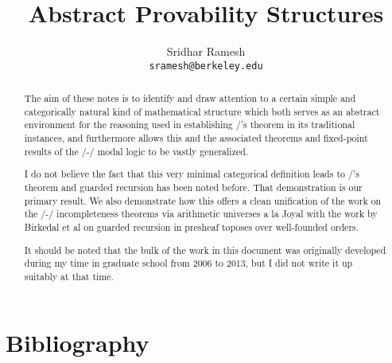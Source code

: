 \documentclass[12pt]{article}
\title{Abstract Provability Structures}
\author{
  Sridhar Ramesh\\
  \texttt{sramesh@berkeley.edu}
}
\begin{document}
\maketitle

\begin{abstract}
The aim of these notes is to identify and draw attention to a certain simple and categorically natural kind of mathematical structure which both serves as an abstract environment for the reasoning used in establishing \Loeb/'s theorem in its traditional instances, and furthermore allows this and the associated theorems and fixed-point results of the \Goedel/-\Loeb/ modal logic to be vastly generalized.

I do not believe the fact that this very minimal categorical definition leads to \Loeb/'s theorem and guarded recursion has been noted before. That demonstration is our primary result. We also demonstrate how this offers a clean unification of the work on the \Godel/-\Lob/ incompleteness theorems via arithmetic universes a la Joyal with the work by Birkedal et al on guarded recursion in presheaf toposes over well-founded orders.

It should be noted that the bulk of the work in this document was originally developed during my time in graduate school from 2006 to 2013, but I did not write it up suitably at that time.
\end{abstract}

\newpage
{}
\setcounter{page}{1}
\tableofcontents












\newpage \section{Bibliography}
\printbibliography

\printindex
\end{document}
